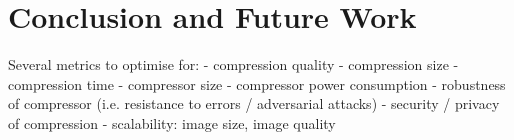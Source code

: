 
\chapter{Conclusion and Future Work}

Several metrics to optimise for:
- compression quality
- compression size
- compression time
- compressor size
- compressor power consumption
- robustness of compressor (i.e. resistance to errors / adversarial attacks)
- security / privacy of compression
- scalability: image size, image quality


